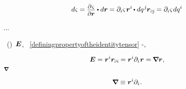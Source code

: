 \begin{equation}
d \varsigma \hspace{-0.1ex}
=
\scalebox{0.9}{$ \displaystyle\frac{\raisebox{-0.2em}{$\partial \hspace{.15ex} \varsigma$}}{\partial \locationvector} $} \dotp d\locationvector \hspace{-0.1ex}
=
\partial_i \varsigma \hspace{.2ex} \locationvector^i \hspace{-0.15ex} \dotp dq^{\hspace{.12ex}j} \hspace{-0.1ex} \locationvector_\differentialindex{\hspace{-0.1ex}j} \hspace{-0.2ex}
=
\partial_i \varsigma \hspace{.15ex} dq^i
\end{equation}

...

~()~${\hspace{-0.1ex}\bm{E}}$,
~\eqref{definingpropertyoftheidentitytensor}
\dotproductinquotes\hbox{-},

\nopagebreak\vspace{-0.1em}\begin{equation}
\UnitDyad
= \locationvector^i \locationvector_\differentialindex{i} \hspace{-0.15ex}
= \tikzmark{beginOriginOfNabla} \locationvector^i \partial_i \tikzmark{endOriginOfNabla} \hspace{.1ex} \locationvector = \hspace{-0.16ex} \boldnabla \locationvector ,
\end{equation}
%
{${\scriptstyle \bm{\nabla}\hspace{-0.2ex}}$}

\vspace{-0.4em}\noindent
{}  

\nopagebreak\vspace{-0.2em}\begin{equation}
\bm{\nabla}\hspace{-0.2ex} \equiv \bm{r}^i \partial_i \hspace{.1ex} .
\end{equation}

